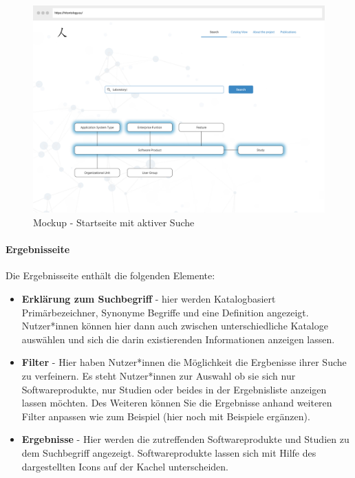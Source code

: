 \begin{figure}[H]
	\centering
    	\includegraphics[width=\textwidth]{Images/Mockup_Startseite_2}
   	\caption{Mockup - Startseite mit aktiver Suche}
   	\label{fig:mockup_start2}
\end{figure}

\paragraph{Ergebnisseite}

Die Ergebnisseite enthält die folgenden Elemente:

\begin{itemize}
\item \textbf{Erklärung zum Suchbegriff} - hier werden Katalogbasiert Primärbezeichner, Synonyme Begriffe und eine Definition angezeigt. Nutzer*innen können hier dann auch zwischen unterschiedliche Kataloge auswählen und sich die darin existierenden Informationen anzeigen lassen.
\item \textbf {Filter} - Hier haben Nutzer*innen die Möglichkeit die Ergbenisse ihrer Suche zu verfeinern. Es steht Nutzer*innen zur Auswahl ob sie sich nur Softwareprodukte, nur Studien oder beides in der Ergebnisliste anzeigen lassen möchten. Des Weiteren können Sie die Ergebnisse anhand weiteren Filter anpassen wie zum Beispiel (hier noch mit Beispiele ergänzen).
\item \textbf{Ergebnisse} - Hier werden die zutreffenden Softwareprodukte und Studien zu dem Suchbegriff angezeigt. Softwareprodukte lassen sich mit Hilfe des dargestellten Icons auf der Kachel unterscheiden.
\end{itemize}

